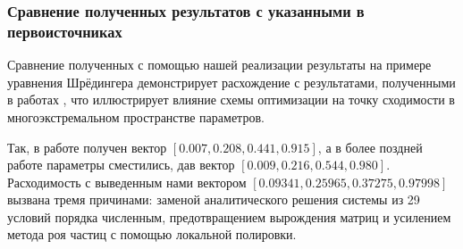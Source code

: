 \subsubsection{Сравнение полученных результатов с указанными в первоисточниках}
Сравнение полученных с помощью нашей реализации результаты на примере уравнения Шрёдингера демонстрирует расхождение с результатами, полученными в работах \cite{Anastassi2023, Anastassi2025}, что иллюстрирует влияние схемы оптимизации на точку сходимости в многоэкстремальном пространстве параметров.

Так, в работе \cite{Anastassi2023} получен вектор $[0.007, 0.208, 0.441, 0.915]$, а в более поздней работе \cite{Anastassi2025} параметры сместились, дав вектор $[0.009, 0.216, 0.544, 0.980]$. Расходимость с выведенным нами вектором $[0.09341, 0.25965, 0.37275, 0.97998]$ вызвана тремя причинами: заменой аналитического решения системы из 29 условий порядка численным, предотвращением вырождения матриц и усилением метода роя частиц с помощью локальной полировки.